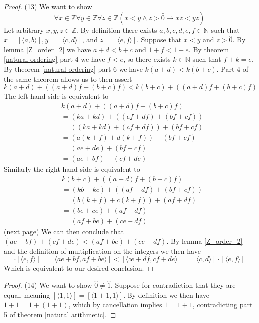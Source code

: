 \documentclass{report}
\begin{document}
\begin{proof}(13) 
We want to show
\begin{equation*}
\forall x\in\mathbb Z\forall y\in\mathbb Z\forall z\in\mathbb Z(x<y\land z>\hat0\to xz<yz)
\end{equation*}
Let arbitrary $x,y,z\in\mathbb Z$. By definition there exists $a,b,c,d,e,f\in\mathbb N$ such that 
$x=[\langle a,b\rangle], y=[\langle c,d\rangle]$, and $z=[\langle e,f\rangle]$.
Suppose that $x<y$ and $z>\hat0$. By lemma \ref{Z_order_2} we have $a+d<b+c$ and $1+f<1+e$. By theorem \ref{natural ordering} part 4 we have
$f<e$, so there exists $k\in\mathbb N$ such that $f+k=e$. By theorem \ref{natural ordering} part 6 we have $k(a+d)<k(b+c)$. Part 4 of the
same theorem allows us to then assert
\begin{equation*}
k(a+d)+((a+d)f+(b+c)f)<k(b+c)+((a+d)f+(b+c)f)
\end{equation*}
The left hand side is equivalent to
\begin{align*}
&k(a+d)+((a+d)f+(b+c)f)\\
&=(ka+kd)+((af+df)+(bf+cf))\\
&=((ka+kd)+(af+df))+(bf+cf)\\
&=(a(k+f)+d(k+f))+(bf+cf)\\
&=(ae+de)+(bf+cf)\\
&=(ae+bf)+(cf+de)
\end{align*}
Similarly the right hand side is equivalent to
\begin{align*}
&k(b+c)+((a+d)f+(b+c)f)\\
&=(kb+kc)+((af+df)+(bf+cf))\\
&=(b(k+f)+c(k+f))+(af+df)\\
&=(be+ce)+(af+df)\\
&=(af+be)+(ce+df)
\end{align*}
(next page)\newpage
We can then conclude that $(ae+bf)+(cf+de)<(af+be)+(ce+df)$. By lemma \ref{Z_order_2} and the definition of multiplication on the integers 
we then have
\begin{equation*}
[\langle a,b\rangle]\cdot[\langle e,f\rangle]=[\langle ae+bf,af+be\rangle]<[\langle ce+df,cf+de\rangle]=[\langle c,d\rangle]\cdot
[\langle e,f\rangle]
\end{equation*}
Which is equivalent to our desired conclusion.
\end{proof}
\begin{proof}(14)
We want to show $\hat0\neq\hat1$. Suppose for contradiction that they are equal, meaning $[\langle 1,1\rangle]=[\langle 1+1,1\rangle]$. 
By definition we then have $1+1=1+(1+1)$, which by cancellation implies $1=1+1$, contradicting part 5 of theorem \ref{natural arithmetic}.
\end{proof}
\newpage
\end{document}

